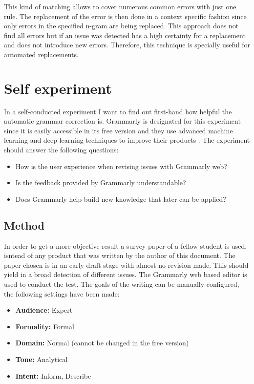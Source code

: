 \documentclass[runningheads]{llncs}
\let\OldTextregistered\textregistered
\renewcommand{\textregistered}{\OldTextregistered\xspace}
\begin{document}
This kind of matching allows to cover numerous common errors with just one rule. The replacement of the error is then done in a context specific fashion since only errors in the specified n-gram are being replaced. This approach does not find all errors but if an issue was detected has a high certainty for a replacement and does not introduce new errors. Therefore, this technique is specially useful for automated replacements.


\section{Self experiment}
In a self-conducted experiment I want to find out first-hand how helpful the automatic grammar correction is. Grammarly\textregistered is designated for this experiment since it is easily accessible in its free version and they use advanced machine learning and deep learning techniques to improve their products \citep{noauthor_grammarly_nodate}. The experiment should answer the following questions:

\begin{itemize}
 \item How is the user experience when revising issues with Grammarly\textregistered web?
 \item Is the feedback provided by Grammarly\textregistered understandable?
 \item Does Grammarly\textregistered help build new knowledge that later can be applied?
\end{itemize}


\subsection{Method}
In order to get a more objective result a survey paper of a fellow student is used, isntead of any product that was written by the author of this document. The paper chosen is in an early draft stage with almost no revision made. This should yield in a broad detection of different issues. The Grammarly\textregistered web based editor is used to conduct the test. The goals of the writing can be manually configured, the following settings have been made:

\begin{itemize}
 \item \textbf{Audience:} Expert
 \item \textbf{Formality:} Formal
 \item \textbf{Domain:} Normal (cannot be changed in the free version)
 \item \textbf{Tone:} Analytical
 \item \textbf{Intent:} Inform, Describe
\end{itemize}
\end{document}
